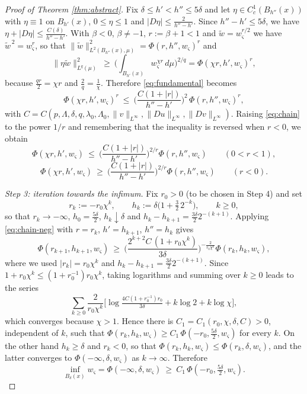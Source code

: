\documentclass[reqno]{amsart}
\theoremstyle{plain}
\theoremstyle{definition}
\theoremstyle{remark}
\begin{document}
\begin{proof}[Proof of Theorem \ref{thm:abstract}]
Fix $\delta\le h'<h''\le5\delta$ and let $\eta\in C_c^1(B_{h''}(x))$ with $\eta\equiv1$ on
$B_{h'}(x)$, $0\le\eta\le1$ and $|D\eta|\le\frac{2}{h''-h'}$. Since $h''-h'\le5\delta$, we have
$\eta+|D\eta|\le\frac{C(\delta)}{h''-h'}$. With $\beta<0$, $\beta\ne-1$, $r:=\beta+1<1$ and
$\widetilde w=w_\varsigma^{r/2}$ we have $\widetilde w^{\,2}=w_\varsigma^{r}$, so that
$\|\widetilde w\|_{L^2(B_{h''}(x),\mu)}^2=\Phi(r,h'',w_\varsigma)^{r}$ and
\[
\|\eta\widetilde w\|^2_{L^{q}(\mu)}
\ \ge\ \Big(\int_{B_{h'}(x)}w_\varsigma^{\chi r}\,d\mu\Big)^{2/q}
=\Phi(\chi r,h',w_\varsigma)^{r} ,
\]
because $\frac{q r}{2}=\chi r$ and $\frac2q=\frac1\chi$. Therefore \eqref{eq:fundamental} becomes
\begin{equation}\label{eq:chain}
\Phi(\chi r,h',w_\varsigma)^{r}\ \le\ \Big(\frac{C(1+|r|)}{h''-h'}\Big)^{2}\,\Phi(r,h'',w_\varsigma)^{r},
\end{equation}
with $C=C(p,\Lambda,\delta,q,\lambda_0,\Lambda_0,\|v\|_{L^\infty},\|Du\|_{L^\infty},\|Dv\|_{L^\infty})$.
Raising \eqref{eq:chain} to the power $1/r$ and remembering that the inequality is reversed when
$r<0$, we obtain
\begin{equation}\label{eq:chain-pos}
\Phi(\chi r,h',w_\varsigma)\ \le\ \Big(\frac{C(1+|r|)}{h''-h'}\Big)^{2/r}\Phi(r,h'',w_\varsigma)
\qquad (0<r<1),
\end{equation}
\begin{equation}\label{eq:chain-neg}
\Phi(\chi r,h',w_\varsigma)\ \ge\ \Big(\frac{C(1+|r|)}{h''-h'}\Big)^{2/r}\Phi(r,h'',w_\varsigma)
\qquad (r<0).
\end{equation}

\emph{Step 3: iteration towards the infimum.} Fix $r_0>0$ (to be chosen in Step 4) and set
\[
r_k:=-r_0\chi^{k},\qquad h_k:=\delta\Big(1+\tfrac32\,2^{-k}\Big),\qquad k\ge0 ,
\]
so that $r_k\to-\infty$, $h_0=\frac{5\delta}{2}$, $h_k\downarrow\delta$ and
$h_k-h_{k+1}=\frac{3\delta}{2}2^{-(k+1)}$. Applying \eqref{eq:chain-neg} with $r=r_k$,
$h'=h_{k+1}$, $h''=h_k$ gives
\[
\Phi(r_{k+1},h_{k+1},w_\varsigma)\ \ge\
\Big(\frac{2^{k+2}C\,(1+r_0\chi^{k})}{3\delta}\Big)^{-\frac{2}{r_0\chi^{k}}}\Phi(r_k,h_k,w_\varsigma) ,
\]
where we used $|r_k|=r_0\chi^{k}$ and $h_k-h_{k+1}=\frac{3\delta}{2}2^{-(k+1)}$. Since
$1+r_0\chi^{k}\le(1+r_0^{-1})r_0\chi^{k}$, taking logarithms and summing over $k\ge0$ leads to the
series
\[
\sum_{k\ge0}\frac{2}{r_0\chi^{k}}\Big[\log\tfrac{4C(1+r_0^{-1})r_0}{3\delta}+k\log 2+k\log\chi\Big] ,
\]
which converges because $\chi>1$. Hence there is $C_1=C_1(r_0,\chi,\delta,C)>0$, independent of
$k$, such that $\Phi(r_k,h_k,w_\varsigma)\ge C_1\,\Phi(-r_0,\frac{5\delta}{2},w_\varsigma)$ for every
$k$. On the other hand $h_k\ge\delta$ and $r_k<0$, so that
$\Phi(r_k,h_k,w_\varsigma)\le\Phi(r_k,\delta,w_\varsigma)$, and the latter converges to
$\Phi(-\infty,\delta,w_\varsigma)$ as $k\to\infty$. Therefore
\begin{equation}\label{eq:toinf}
\inf_{B_{\delta}(x)}w_\varsigma=\Phi(-\infty,\delta,w_\varsigma)\ \ge\ C_1\,\Phi(-r_0,\tfrac{5\delta}{2},w_\varsigma).
\end{equation}


\end{proof}
\end{document}
